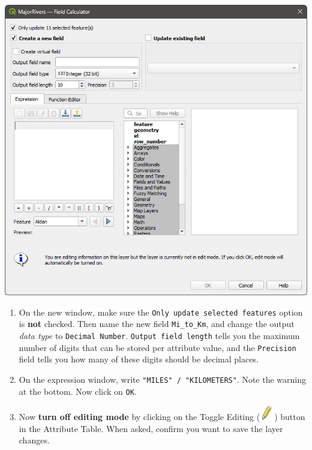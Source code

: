 \documentclass[
  letterpaper,
  DIV=11,
  numbers=noendperiod]{scrreprt}
\begin{document}
\includegraphics{images/lab_3/lab3_fig3_field_calculator.jpg}

\begin{enumerate}
\def\labelenumi{(\arabic{enumi})}
\setcounter{enumi}{97}
\item
  On the new window, make sure the
  \texttt{Only\ update\ selected\ features} option is \textbf{not}
  checked. Then name the new field \texttt{Mi\_to\_Km}, and change the
  output \emph{data type} to \texttt{Decimal\ Number}.
  \texttt{Output\ field\ length} tells you the maximum number of digits
  that can be stored per attribute value, and the \texttt{Precision}
  field tells you how many of these digits should be decimal places.
\item
  On the expression window, write \texttt{"MILES"\ /\ "KILOMETERS"}.
  Note the warning at the bottom. Now click on \texttt{OK}.
\item
  Now \textbf{turn off editing mode} by clicking on the Toggle Editing
  (\includegraphics{index_files/mediabag/mActionToggleEditing.png})
  button in the Attribute Table. When asked, confirm you want to save
  the layer changes.
\end{enumerate}
\end{document}
